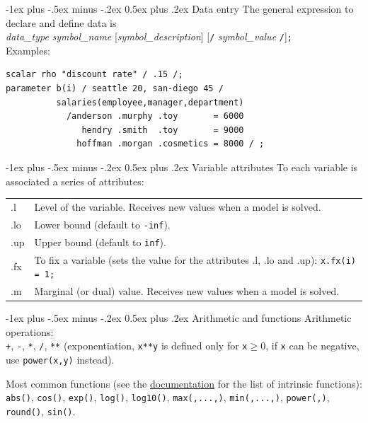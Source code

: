 \documentclass[10pt,landscape,a4paper]{article}
\makeatletter
\renewcommand{\section}{\@startsection{section}{1}{0mm}%
                                {-1ex plus -.5ex minus -.2ex}%
                                {0.5ex plus .2ex}%
                                {\color{blue}\normalfont\large\bfseries}}
\makeatother
\begin{document}
\begin{multicols}{2}
\section{Data entry}
The general expression to declare and define data is\\
\emph{data\_type} \emph{symbol\_name} [\emph{symbol\_description}] [\verb!/! \emph{symbol\_value} \verb!/!]\verb!;!\\
Examples:
\begin{verbatim}
scalar rho "discount rate" / .15 /;
parameter b(i) / seattle 20, san-diego 45 /
          salaries(employee,manager,department)
            /anderson .murphy .toy       = 6000
               hendry .smith  .toy       = 9000
              hoffman .morgan .cosmetics = 8000 / ;
\end{verbatim}

\section{Variable attributes}
To each variable is associated a series of attributes:\\
\begin{tabular}{@{}>{\ttfamily}ll@{}}
  .l & Level of the variable. Receives new values when a model is solved.\\
  .lo & Lower bound (default to \texttt{-inf}).\\
  .up & Upper bound (default to \texttt{inf}).\\
  .fx & To fix a variable (sets the value for the attributes .l, .lo and .up):\linebreak{}
  \texttt{x.fx(i) = 1;}\\
  .m & Marginal (or dual) value. Receives new values when a model is solved.
\end{tabular}

\section{Arithmetic and functions}
Arithmetic operations:\\
\verb!+!, \verb!-!, \verb!*!, \verb!/!, \verb!**! (exponentiation, \verb!x**y!
is defined only for \verb!x!$\ge$0, if \texttt{x} can be negative, use
\verb!power(x,y)! instead).

Most common functions
(see the \href{http://www.gams.com/help/topic/gams.doc/userguides/userguide/_u_g__parameters.html?cp=0_2_0_1_3_2_2_0#UG_Parameters_IntrinsicFunctions}{documentation} for the list of intrinsic functions):\\
\verb!abs()!, \verb!cos()!, \verb!exp()!, \verb!log()!, \verb!log10()!,
\verb!max(,...,)!, \verb!min(,...,)!, \verb!power(,)!, \verb!round()!,
\verb!sin()!.


\end{multicols}
\end{document}

